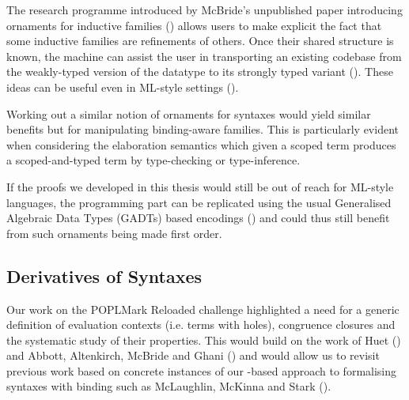 The research programme introduced by McBride's unpublished paper introducing
ornaments for inductive families (\citeyear{mcbride2010ornamental}) allows users
to make explicit the fact that some inductive families are refinements of
others.
Once their shared structure is known, the machine can assist the user in
transporting an existing codebase from the weakly-typed version of the datatype
to its strongly typed variant (\cite{dagand_mcbride_2014}). These ideas can be
useful even in ML-style settings (\cite{Williams:2014:OP:2633628.2633631}).

Working out a similar notion of ornaments for syntaxes would yield similar
benefits but for manipulating binding-aware families. This is particularly
evident when considering the elaboration semantics which given a scoped term
produces a scoped-and-typed term by type-checking or type-inference.

If the proofs we developed in this thesis would still be out of reach for
ML-style languages, the programming part can be replicated using the usual
Generalised Algebraic Data Types (GADTs) based encodings
(\cite{danvytagless,lindley2014hasochism}) and could thus still benefit from
such ornaments being made first order.

\subsection{Derivatives of Syntaxes}

Our work on the POPLMark Reloaded challenge highlighted a need for a generic
definition of evaluation contexts (i.e. terms with holes), congruence closures
and the systematic study of their properties. This would build on the work of
Huet (\citeyear{huet_1997}) and Abbott, Altenkirch, McBride and Ghani
(\citeyear{abbott2005data}) and would allow us to revisit previous work
based on concrete instances of our -based approach to
formalising syntaxes with binding such as McLaughlin, McKinna and
Stark (\citeyear{craig2018triangle}).
